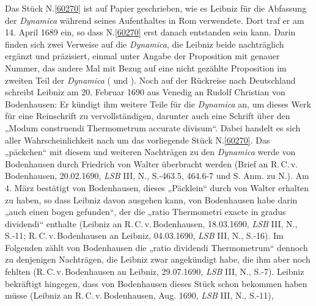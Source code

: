 

\footnotesize%
\pstart%
\noindent%
Das Stück N.\;\ref{60270} ist auf Papier geschrieben, wie es Leibniz für die Abfassung der \textit{Dynamica}\cite{01354} während seines Aufenthaltes in Rom verwendete. Dort traf er am 14. April 1689 ein, so dass N.\;\ref{60270} erst danach entstanden sein kann.  Darin finden sich zwei Verweise auf die \textit{Dynamica}\cite{01354}, die Leibniz beide nachträglich ergänzt und präzisiert, einmal unter Angabe der Proposition mit genauer Nummer, das andere Mal mit Bezug auf eine nicht gezählte Proposition im zweiten Teil der \textit{Dynamica}\cite{01354} ( und ). 
\pend
\pstart
Noch auf der Rückreise nach Deutschland schreibt Leibniz am 20. Februar 1690 aus Venedig an Rudolf Christian von Bodenhausen: Er kündigt ihm weitere Teile für die \textit{Dynamica}\cite{01354} an, um dieses Werk für eine Reinschrift zu vervollständigen, darunter auch eine Schrift über den „Modum construendi Thermometrum accurate divisum“. Dabei handelt es sich aller Wahrscheinlichkeit nach um das vorliegende Stück N.\;\ref{60270}. Das „päckchen“ mit diesem und weiteren Nachträgen zu den \textit{Dynamica}\cite{01354} werde von Bodenhausen durch Friedrich von Walter überbracht werden (Brief an R.\,C.\,v.\,Bodenhausen, 20.02.1690,\cite{01527} \textit{LSB} III, N., S.-463.5, 464.6-7 und S. Anm. zu N.). Am 4. März bestätigt von Bodenhausen, dieses „Päcklein“ durch von Walter erhalten zu haben, so dass Leibniz davon ausgehen kann, von Bodenhausen habe darin „auch einen bogen gefunden“, der die „ratio Thermometri exacte in gradus dividendi“ enthalte (Leibniz an R.\,C.\,v.\,Bodenhausen, 18.03.1690, \textit{LSB} III, N.\cite{01392}, S.-11; R.\,C.\,v.\,Bodenhausen an Leibniz, 04.03.1690, \textit{LSB} III, N.\cite{01389}, S.-16). Im Folgenden zählt von Bodenhausen  die „ratio dividendi Thermometrum“ dennoch zu denjenigen Nachträgen, die Leibniz zwar angekündigt habe, die ihm aber noch fehlten (R.\,C.\,v.\,Bodenhausen an Leibniz, 29.07.1690, \textit{LSB} III, N.\cite{01393}, S.-7). Leibniz bekräftigt hingegen, dass von Bodenhausen dieses Stück schon bekommen haben müsse  (Leibniz an R.\,C.\,v.\,Bodenhausen, Aug. 1690,\cite{01528} \textit{LSB} III, N., S.-11), 

